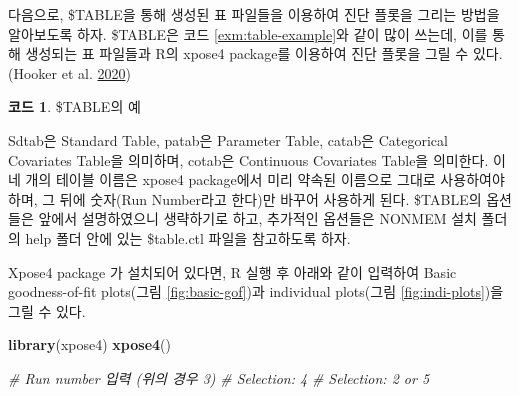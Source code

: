 \documentclass[
  10pt,
  krantz2,
  a4paper]{krantz}
\newenvironment{Shaded}{\begin{snugshade}}{\end{snugshade}}
\newcommand{\CommentTok}[1]{\textcolor[rgb]{0.56,0.35,0.01}{\textit{#1}}}
\newcommand{\DecValTok}[1]{\textcolor[rgb]{0.00,0.00,0.81}{#1}}
\newcommand{\KeywordTok}[1]{\textcolor[rgb]{0.13,0.29,0.53}{\textbf{#1}}}
\newcommand{\NormalTok}[1]{#1}
\newcommand{\OperatorTok}[1]{\textcolor[rgb]{0.81,0.36,0.00}{\textbf{#1}}}
\newcommand{\StringTok}[1]{\textcolor[rgb]{0.31,0.60,0.02}{#1}}
\newenvironment{Shaded}{\begin{snugshade}}{\end{snugshade}}
\theoremstyle{definition}
\theoremstyle{definition}
\newtheorem{example}{코드}[chapter]
\theoremstyle{definition}
\theoremstyle{remark}
\begin{document}
다음으로, \$TABLE을 통해 생성된 표 파일들을 이용하여 진단 플롯을 그리는 방법을 알아보도록 하자. \$TABLE은 코드 \ref{exm:table-example}와 같이 많이 쓰는데, 이를 통해 생성되는 표 파일들과 R의 xpose4 package를 이용하여 진단 플롯을 그릴 수 있다. (Hooker et al. \protect\hyperlink{ref-R-xpose4}{2020})

\begin{Shaded}
\end{Shaded}

\begin{example}
\protect\hypertarget{exm:table-example}{}{\label{exm:table-example} }\$TABLE의 예
\end{example}

Sdtab은 Standard Table, patab은 Parameter Table, catab은 Categorical Covariates Table을 의미하며, cotab은 Continuous Covariates Table을 의미한다. 이 네 개의 테이블 이름은 xpose4 package에서 미리 약속된 이름으로 그대로 사용하여야 하며, 그 뒤에 숫자(Run Number라고 한다)만 바꾸어 사용하게 된다. \$TABLE의 옵션들은 앞에서 설명하였으니 생략하기로 하고, 추가적인 옵션들은 NONMEM 설치 폴더의 help 폴더 안에 있는 \$table.ctl 파일을 참고하도록 하자.

Xpose4 package 가 설치되어 있다면, R 실행 후 아래와 같이 입력하여 Basic goodness-of-fit plots(그림 \ref{fig:basic-gof})과 individual plots(그림 \ref{fig:indi-plots})을 그릴 수 있다.

\begin{Shaded}
\begin{Highlighting}[]
\KeywordTok{library}\NormalTok{(xpose4)}
\KeywordTok{xpose4}\NormalTok{()}

\CommentTok{\# Run number 입력 (위의 경우 3)}
\CommentTok{\# Selection: 4}
\CommentTok{\# Selection: 2 or 5}
\end{Highlighting}
\end{Shaded}
\end{document}
